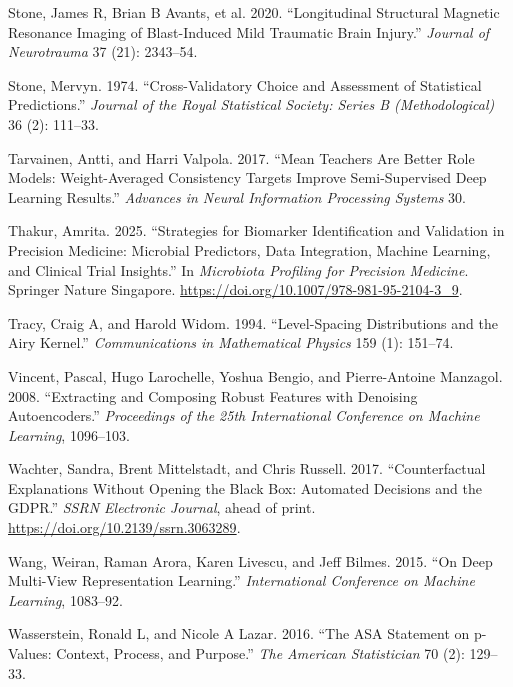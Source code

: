 \documentclass[
  letterpaper,
]{report}
\newlength{\cslhangindent}
\newenvironment{CSLReferences}[2] %
 {\begin{list}{}{%
  \setlength{\itemindent}{0pt}
  \setlength{\leftmargin}{0pt}
  \setlength{\parsep}{0pt}
  \ifodd #1
   \setlength{\leftmargin}{\cslhangindent}
   \setlength{\itemindent}{-1\cslhangindent}
  \fi
  \setlength{\itemsep}{#2\baselineskip}}}
 {\end{list}}
\begin{document}
\begin{CSLReferences}{1}{1}
{Stone, James R, Brian B Avants, et al.} 2020. {``Longitudinal
Structural Magnetic Resonance Imaging of Blast-Induced Mild Traumatic
Brain Injury.''} \emph{Journal of Neurotrauma} 37 (21): 2343--54.

Stone, Mervyn. 1974. {``Cross-Validatory Choice and Assessment of
Statistical Predictions.''} \emph{Journal of the Royal Statistical
Society: Series B (Methodological)} 36 (2): 111--33.

Tarvainen, Antti, and Harri Valpola. 2017. {``Mean Teachers Are Better
Role Models: Weight-Averaged Consistency Targets Improve Semi-Supervised
Deep Learning Results.''} \emph{Advances in Neural Information
Processing Systems} 30.

Thakur, Amrita. 2025. {``Strategies for Biomarker Identification and
Validation in Precision Medicine: Microbial Predictors, Data
Integration, Machine Learning, and Clinical Trial Insights.''} In
\emph{Microbiota Profiling for Precision Medicine}. Springer Nature
Singapore. \url{https://doi.org/10.1007/978-981-95-2104-3_9}.

Tracy, Craig A, and Harold Widom. 1994. {``Level-Spacing Distributions
and the Airy Kernel.''} \emph{Communications in Mathematical Physics}
159 (1): 151--74.

Vincent, Pascal, Hugo Larochelle, Yoshua Bengio, and Pierre-Antoine
Manzagol. 2008. {``Extracting and Composing Robust Features with
Denoising Autoencoders.''} \emph{Proceedings of the 25th International
Conference on Machine Learning}, 1096--103.

Wachter, Sandra, Brent Mittelstadt, and Chris Russell. 2017.
{``Counterfactual Explanations Without Opening the Black Box: Automated
Decisions and the GDPR.''} \emph{SSRN Electronic Journal}, ahead of
print. \url{https://doi.org/10.2139/ssrn.3063289}.

Wang, Weiran, Raman Arora, Karen Livescu, and Jeff Bilmes. 2015. {``On
Deep Multi-View Representation Learning.''} \emph{International
Conference on Machine Learning}, 1083--92.

Wasserstein, Ronald L, and Nicole A Lazar. 2016. {``The ASA Statement on
p-Values: Context, Process, and Purpose.''} \emph{The American
Statistician} 70 (2): 129--33.


\end{CSLReferences}
\end{document}
